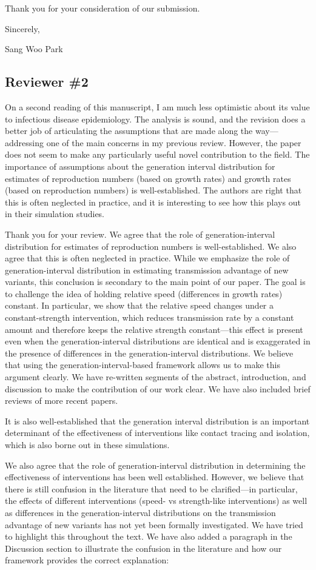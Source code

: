 \documentclass[12pt]{article}
\newcommand{\rev}{\subsection*}
\newcommand{\revtext}{\textsf}
\begin{document}
Thank you for your consideration of our submission.

Sincerely,

Sang Woo Park

\rev{Reviewer \#2}

\revtext{On a second reading of this manuscript, I am much less optimistic about its value to infectious disease epidemiology. The analysis is sound, and the revision does a better job of articulating the assumptions that are made along the way---addressing one of the main concerns in my previous review. However, the paper does not seem to make any particularly useful novel contribution to the field. The importance of assumptions about the generation interval distribution for estimates of reproduction numbers (based on growth rates) and growth rates (based on reproduction numbers) is well-established. The authors are right that this is often neglected in practice, and it is interesting to see how this plays out in their simulation studies.}

Thank you for your review.
We agree that the role of generation-interval distribution for estimates of reproduction numbers is well-established. We also agree that this is often neglected in practice. 
While we emphasize the role of generation-interval distribution in estimating transmission advantage of new variants, this conclusion is secondary to the main point of our paper. 
The goal is to challenge the idea of holding relative speed (differences in growth rates) constant.
In particular, we show that the relative speed changes under a constant-strength intervention, which reduces transmission rate by a constant amount and therefore keeps the relative strength constant---this effect is present even when the generation-interval distributions are identical and is exaggerated in the presence of differences in the generation-interval distributions.
We believe that using the generation-interval-based framework allows us to make this argument clearly.
We have re-written segments of the abstract, introduction, and discussion to make the contribution of our work clear.
We have also included brief reviews of more recent papers.

\revtext{It is also well-established that the generation interval distribution is an important determinant of the effectiveness of interventions like contact tracing and isolation, which is also borne out in these simulations.}

We also agree that the role of generation-interval distribution in determining the effectiveness of interventions has been well established.
However, we believe that there is still confusion in the literature that need to be clarified---in particular, the effects of different interventions (speed- vs strength-like interventions) as well as differences in the generation-interval distributions on the transmission advantage of new variants has not yet been formally investigated.
We have tried to highlight this throughout the text.
We have also added a paragraph in the Discussion section to illustrate the confusion in the literature and how our framework provides the correct explanation: 
\end{document}
